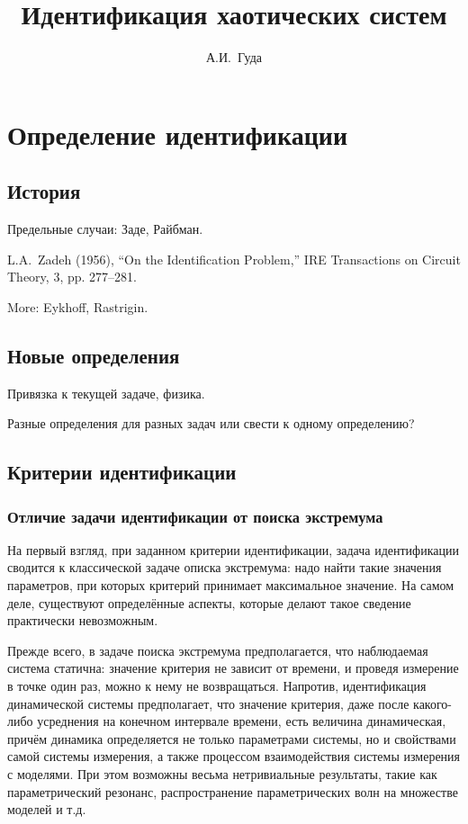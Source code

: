 \documentclass[a4paper,12pt]{article}
\title{Идентификация хаотических систем}
\author{А.И.~Гуда}
\newcommand{\Cmt}[1]{ {\small\color{red}#1} }
\begin{document}
{ \tiny \currfilepath }

\tableofcontents


\section{Определение идентификации}

\subsection{История}

\Cmt{Предельные случаи: Заде, Райбман.}

L.A.~Zadeh (1956), ``On the Identification Problem,''
IRE Transactions on Circuit Theory, 3, pp.  277--281.

More: Eykhoff, Rastrigin.

\subsection{Новые определения}

\Cmt{Привязка к текущей задаче, физика.}

\Cmt{Разные определения для разных задач или свести к одному определению?}

\subsection{Критерии идентификации}

\subsubsection{Отличие задачи идентификации от поиска экстремума}

На первый взгляд, при заданном критерии идентификации, задача идентификации
сводится к классической задаче описка экстремума: надо найти такие значения
параметров, при которых критерий принимает максимальное значение.
На самом деле, существуют определённые аспекты, которые делают такое
сведение практически невозможным.

Прежде всего, в задаче поиска
экстремума предполагается, что наблюдаемая система статична:
значение критерия не зависит от времени, и проведя измерение
в точке один раз, можно к нему не возвращаться.
Напротив, идентификация динамической системы предполагает,
что значение критерия, даже после какого-либо усреднения на конечном
интервале времени, есть величина динамическая, причём динамика определяется
не только параметрами системы, но и свойствами самой системы измерения,
а также процессом взаимодействия системы измерения с моделями. При этом
возможны весьма нетривиальные результаты, такие как параметрический
резонанс, распространение параметрических волн на множестве моделей и т.д.
\end{document}
